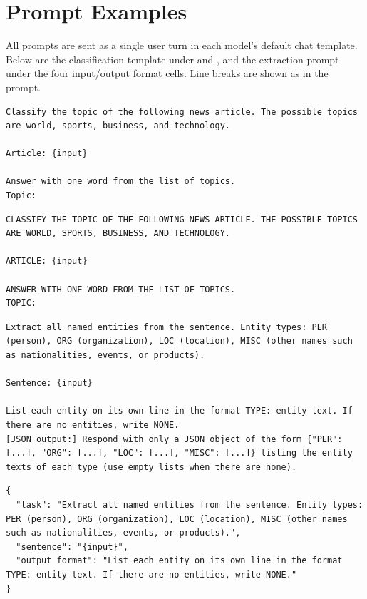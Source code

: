 \section{Prompt Examples}
\label{app:prompts}

All prompts are sent as a single user turn in each model's default chat template. Below are the \agnews classification template under  and \capsedit, and the \conll extraction prompt under the four input/output format cells. Line breaks are shown as in the prompt.

\begin{lstlisting}[caption={\agnews, \edit{base}.}]
Classify the topic of the following news article. The possible topics are world, sports, business, and technology.

Article: {input}

Answer with one word from the list of topics.
Topic:
\end{lstlisting}

\begin{lstlisting}[caption={\agnews, \capsedit (the inserted article is unchanged).}]
CLASSIFY THE TOPIC OF THE FOLLOWING NEWS ARTICLE. THE POSSIBLE TOPICS ARE WORLD, SPORTS, BUSINESS, AND TECHNOLOGY.

ARTICLE: {input}

ANSWER WITH ONE WORD FROM THE LIST OF TOPICS.
TOPIC:
\end{lstlisting}

\begin{lstlisting}[caption={\conll, plain input with plain output (JSON output replaces the last line).}]
Extract all named entities from the sentence. Entity types: PER (person), ORG (organization), LOC (location), MISC (other names such as nationalities, events, or products).

Sentence: {input}

List each entity on its own line in the format TYPE: entity text. If there are no entities, write NONE.
[JSON output:] Respond with only a JSON object of the form {"PER": [...], "ORG": [...], "LOC": [...], "MISC": [...]} listing the entity texts of each type (use empty lists when there are none).
\end{lstlisting}

\begin{lstlisting}[caption={\conll, JSON input with plain output.}]
{
  "task": "Extract all named entities from the sentence. Entity types: PER (person), ORG (organization), LOC (location), MISC (other names such as nationalities, events, or products).",
  "sentence": "{input}",
  "output_format": "List each entity on its own line in the format TYPE: entity text. If there are no entities, write NONE."
}
\end{lstlisting}

